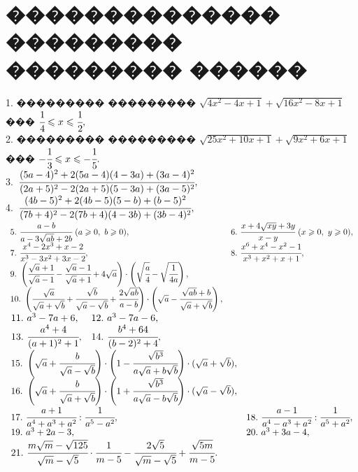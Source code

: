 \documentclass[12pt]{article}
\begin{document}
\section{�������������� ��������� ��������� ������}
1. ��������� ��������� $\sqrt{4x^2-4x+1}+\sqrt{16x^2-8x+1}$ ��� $\cfrac{1}{4}\leqslant x\leqslant\cfrac{1}{2},$\\
2. ��������� ��������� $\sqrt{25x^2+10x+1}+\sqrt{9x^2+6x+1}$ ��� $-\cfrac{1}{3}\leqslant x\leqslant-\cfrac{1}{5}.$\\
3.\ $\cfrac{(5a-4)^2+2(5a-4)(4-3a)+(3a-4)^2}{(2a+5)^2-2(2a+5)(5-3a)+(3a-5)^2},$\\
4.\ $\cfrac{(4b-5)^2+2(4b-5)(5-b)+(b-5)^2}{(7b+4)^2-2(7b+4)(4-3b)+(3b-4)^2},$\\
$\begin{array}{ll}
5.\ \cfrac{a-b}{a-3\sqrt{ab}+2b}\ (a\geqslant0,\ b\geqslant0),&
6.\ \cfrac{x+4\sqrt{xy}+3y}{x-y}\ (x\geqslant0,\ y\geqslant0),\\
7.\ \cfrac{x^4-2x^3+x-2}{x^3-3x^2+3x-2},&
8.\ \cfrac{x^6+x^4-x^2-1}{x^3+x^2+x+1},\\
9.\ \left(\cfrac{\sqrt{a}+1}{\sqrt{a}-1}-\cfrac{\sqrt{a}-1}{\sqrt{a}+1}+4\sqrt{a}\right)\cdot
\left(\sqrt{\cfrac{a}{4}}-\sqrt{\cfrac{1}{4a}}\right),\\
10.\ \left(\cfrac{\sqrt{a}}{\sqrt{a}+\sqrt{b}}+\cfrac{\sqrt{b}}{\sqrt{a}-\sqrt{b}}+
\cfrac{2\sqrt{ab}}{a-b}\right)\cdot\left(\sqrt{a}-\cfrac{\sqrt{ab}+b}{\sqrt{a}+\sqrt{b}}\right),
\end{array}$\\
$\begin{array}{ll}
11.\ a^3-7a+6,&
12.\ a^3-7a-6,\\
13.\ \cfrac{a^4+4}{(a+1)^2+1},&
14.\ \cfrac{b^4+64}{(b-2)^2+4},\end{array}$\\ $\begin{array}{ll}
15.\ \left(\sqrt{a}+\cfrac{b}{\sqrt{a}-\sqrt{b}}\right)\cdot\left(1-\cfrac{\sqrt{b^3}}{a\sqrt{a}+b\sqrt{b}}\right)\cdot
(\sqrt{a}+\sqrt{b}),\\
16.\ \left(\sqrt{a}+\cfrac{b}{\sqrt{a}+\sqrt{b}}\right)\cdot\left(1+\cfrac{\sqrt{b^3}}{a\sqrt{a}-b\sqrt{b}}\right)\cdot
(\sqrt{a}-\sqrt{b}),\\
17.\ \cfrac{a+1}{a^4+a^3+a^2}: \cfrac{1}{a^5-a^2},&
18.\ \cfrac{a-1}{a^4-a^3+a^2}: \cfrac{1}{a^5+a^2},\\
19.\ a^3+2a-3,&
20.\ a^3+3a-4,
\end{array}$\\
$\begin{array}{ll}
21.\ \cfrac{m\sqrt{m}-\sqrt{125}}{\sqrt{m}-\sqrt{5}}\cdot\cfrac{1}{m-5}-\cfrac{2\sqrt{5}}{\sqrt{m}-\sqrt{5}}+\cfrac{\sqrt{5m}}{m-5}.\\
\end{array}$\\
\end{document}
